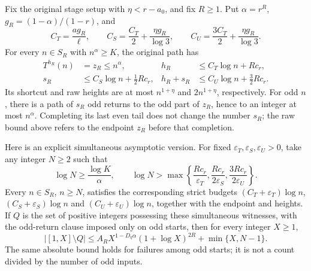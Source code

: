 \begin{corollary}
\label{cor:Shaik-closed-graded}
Fix the original stage setup with \(\eta<r-a_0\), and fix \(R\ge1\).
Put \(\alpha=r^R\), \(g_R=(1-\alpha)/(1-r)\), and
\begin{equation}\label{eq:Shaik-closed-coefficients}
 C_T=\frac{a g_R}{\ell},\qquad
 C_S=\frac{C_T}{2}+\frac{\eta g_R}{\log3},\qquad
 C_U=\frac{3C_T}{2}+\frac{\eta g_R}{\log3}.
\end{equation}
For every \(n\in S_R\) with \(n^\alpha\ge K\), the original path has
\begin{align}
 T^{h_R}(n)&=z_R\le n^\alpha,&
 h_R&\le C_T\log n+R c_r, \label{eq:Shaik-closed-shortcut}\\
 s_R&\le C_S\log n+\tfrac12 R c_r,&
 h_R+s_R&\le C_U\log n+\tfrac32 R c_r .
 \label{eq:Shaik-closed-three}
\end{align}
Its shortcut and raw heights are at most \(n^{1+\eta}\) and
\(2n^{1+\eta}\), respectively. For odd \(n\), there is a path of
\(s_R\) odd returns to the odd part of \(z_R\), hence to an integer
at most \(n^\alpha\). Completing its last even tail does not change
the number \(s_R\); the raw bound above refers to the endpoint \(z_R\)
before that completion.

Here is an explicit simultaneous asymptotic version. For fixed
\(\varepsilon_T,\varepsilon_S,\varepsilon_U>0\), take any integer
\(N\ge2\) such that
\begin{equation}\label{eq:Shaik-closed-cutoff}
 \log N\ge\frac{\log K}{\alpha},\qquad
 \log N>
 \max\left\{\frac{Rc_r}{\varepsilon_T},
            \frac{Rc_r}{2\varepsilon_S},
            \frac{3Rc_r}{2\varepsilon_U}\right\}.
\end{equation}
Every \(n\in S_R\), \(n\ge N\), satisfies the corresponding strict
budgets \((C_T+\varepsilon_T)\log n\),
\((C_S+\varepsilon_S)\log n\) and
\((C_U+\varepsilon_U)\log n\), together with the endpoint and heights.
If \(Q\) is the set of positive integers possessing these simultaneous
witnesses, with the odd-return clause imposed only on odd starts, then
for every integer \(X\ge1\),
\begin{equation}\label{eq:Shaik-closed-count}
 |[1,X]\setminus Q|
 \le A_R X^{1-D_\eta\alpha}(1+\log X)^{2R}
       +\min\{X,N-1\}.
\end{equation}
The same absolute bound holds for failures among odd starts; it is not
a count divided by the number of odd inputs.
\end{corollary}
